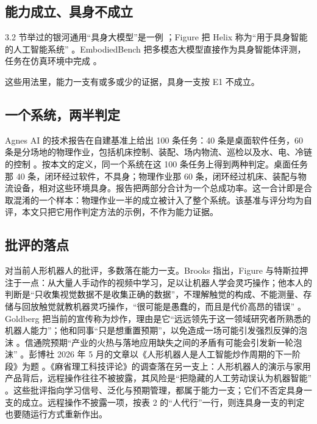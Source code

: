 \documentclass[10pt,fontset=fandol]{ctexart}
\begin{document}
\subsection{能力成立、具身不成立}

3.2 节举过的银河通用“具身大模型”是一例 \cite{galbot}；Figure 把 Helix 称为“用于具身智能的人工智能系统” \cite{figure_seriesc}。EmbodiedBench 把多模态大模型直接作为具身智能体评测，任务在仿真环境中完成 \cite{yang2025embodiedbench}。

这些用法里，能力一支有或多或少的证据，具身一支按 E1 不成立。

\subsection{一个系统，两半判定}

Agnes AI 的技术报告在自建基准上给出 100 条任务：40 条是桌面软件任务，60 条是分场地的物理作业，包括机床控制、装配、场内物流、巡检以及水、电、冷链的控制 \cite{agnestr2026}。按本文的定义，同一个系统在这 100 条任务上得到两种判定。桌面任务那 40 条，闭环经过软件，不具身；物理作业那 60 条，闭环经过机床、装配与物流设备，相对这些环境具身。报告把两部分合计为一个总成功率。这一合计即是合取混淆的一个样本：物理作业一半的成立被计入了整个系统。该基准与评分均为自评，本文只把它用作判定方法的示例，不作为能力证据。

\subsection{批评的落点}

对当前人形机器人的批评，多数落在能力一支。Brooks 指出，Figure 与特斯拉押注于一点：从大量人手动作的视频中学习，足以让机器人学会灵巧操作；他本人的判断是“只收集视觉数据不是收集正确的数据”，不理解触觉的构成、不能测量、存储与回放触觉就教机器灵巧操作，“很可能是愚蠢的，而且是代价高昂的错误” \cite{brooks2025}。Goldberg 把当前的宣传称为炒作，理由是它“远远领先于这一领域研究者所熟悉的机器人能力”；他和同事“只是想重置预期”，以免造成一场可能引发强烈反弹的泡沫 \cite{goldberg2025}。信通院预期“产业的火热与落地应用缺失之间的矛盾有可能会引发新一轮泡沫” \cite{caict2025}。彭博社 2026 年 5 月的文章以《人形机器人是人工智能炒作周期的下一阶段》为题 \cite{bloomberg2026}。《麻省理工科技评论》的调查落在另一支上：人形机器人的演示与家用产品背后，远程操作往往不被披露，其风险是“把隐藏的人工劳动误认为机器智能” \cite{mittr2026}。这些批评指向学习信号、泛化与预期管理，都属于能力一支；它们不否定具身一支的成立。远程操作不披露一项，按表 2 的“人代行”一行，则连具身一支的判定也要随运行方式重新作出。
\end{document}

